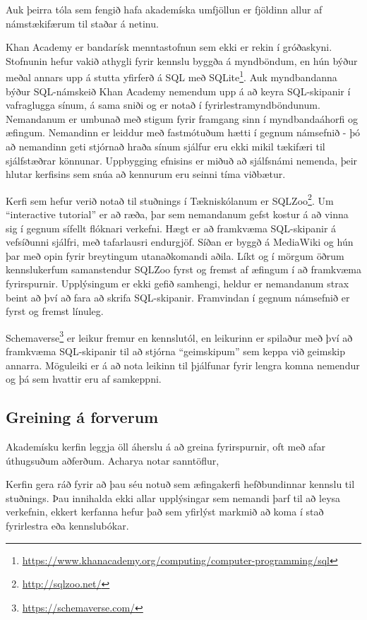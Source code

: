 \documentclass[a4paper,12pt,twoside,BCOR=10mm]{scrbook}
\begin{document}
Auk þeirra tóla sem fengið hafa akademíska umfjöllun er fjöldinn allur af námstækifærum til staðar á netinu.

Khan Academy er bandarísk menntastofnun sem ekki er rekin í gróðaskyni. Stofnunin hefur vakið athygli fyrir kennslu byggða á myndböndum, en hún býður meðal annars upp á stutta yfirferð á SQL með SQLite\footnote{\url{https://www.khanacademy.org/computing/computer-programming/sql}}. Auk myndbandanna býður SQL-námskeið Khan Academy nemendum upp á að keyra SQL-skipanir í vafraglugga sínum, á sama sniði og er notað í fyrirlestramyndböndunum. Nemandanum er umbunað með stigum fyrir framgang sinn í myndbandaáhorfi og æfingum. Nemandinn er leiddur með fastmótuðum hætti í gegnum námsefnið - þó að nemandinn geti stjórnað hraða sínum sjálfur eru ekki mikil tækifæri til sjálfstæðrar könnunar. Uppbygging efnisins er miðuð að sjálfsnámi nemenda, þeir hlutar kerfisins sem snúa að kennurum eru seinni tíma viðbætur.

Kerfi sem hefur verið notað til stuðnings í Tækniskólanum er SQLZoo\footnote{\url{http://sqlzoo.net/}}. Um ``interactive tutorial'' er að ræða, þar sem nemandanum gefst kostur á að vinna sig í gegnum sífellt flóknari verkefni. Hægt er að framkvæma SQL-skipanir á vefsíðunni sjálfri, með tafarlausri endurgjöf. Síðan er byggð á MediaWiki og hún þar með opin fyrir breytingum utanaðkomandi aðila.
Líkt og í mörgum öðrum kennslukerfum samanstendur SQLZoo fyrst og fremst af æfingum í að framkvæma fyrirspurnir. Upplýsingum er ekki gefið samhengi, heldur er nemandanum strax beint að því að fara að skrifa SQL-skipanir. Framvindan í gegnum námsefnið er fyrst og fremst línuleg.

Schemaverse\footnote{\url{https://schemaverse.com/}} er leikur fremur en kennslutól, en leikurinn er spilaður með því að framkvæma SQL-skipanir til að stjórna ``geimskipum'' sem keppa við geimskip annarra. Möguleiki er á að nota leikinn til þjálfunar fyrir lengra komna nemendur og þá sem hvattir eru af samkeppni.
\subsection{Greining á forverum}
Akademísku kerfin leggja öll áherslu á að greina fyrirspurnir, oft með afar úthugsuðum aðferðum. Acharya\cite{bhagat2002} notar sanntöflur, 

Kerfin gera ráð fyrir að þau séu notuð sem æfingakerfi hefðbundinnar kennslu til stuðnings. Þau innihalda ekki allar upplýsingar sem nemandi þarf til að leysa verkefnin, ekkert kerfanna hefur það sem yfirlýst markmið að koma í stað fyrirlestra eða kennslubókar. 
\end{document}
